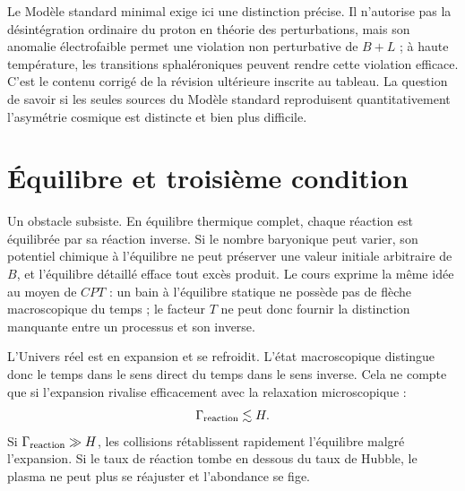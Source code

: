 Le Modèle standard minimal exige ici une distinction précise. Il n’autorise pas la désintégration ordinaire du proton en théorie des perturbations, mais son anomalie électrofaible permet une violation non perturbative de \(B+L\) ; à haute température, les transitions sphaléroniques peuvent rendre cette violation efficace. C’est le contenu corrigé de la révision ultérieure inscrite au tableau. La question de savoir si les seules sources du Modèle standard reproduisent quantitativement l’asymétrie cosmique est distincte et bien plus difficile.

\section{Équilibre et troisième condition}

Un obstacle subsiste. En équilibre thermique complet, chaque réaction est équilibrée par sa réaction inverse. Si le nombre baryonique peut varier, son potentiel chimique à l’équilibre ne peut préserver une valeur initiale arbitraire de \(B\), et l’équilibre détaillé efface tout excès produit. Le cours exprime la même idée au moyen de \(CPT\) : un bain à l’équilibre statique ne possède pas de flèche macroscopique du temps ; le facteur \(T\) ne peut donc fournir la distinction manquante entre un processus et son inverse.

L’Univers réel est en expansion et se refroidit. L’état macroscopique distingue donc le temps dans le sens direct du temps dans le sens inverse. Cela ne compte que si l’expansion rivalise efficacement avec la relaxation microscopique :
\begin{equation}
\Gamma_{\rm reaction}\lesssim H.
\label{eq:c08-freezeout-condition}
\end{equation}
Si \(\Gamma_{\rm reaction}\gg H\), les collisions rétablissent rapidement l’équilibre malgré l’expansion. Si le taux de réaction tombe en dessous du taux de Hubble, le plasma ne peut plus se réajuster et l’abondance se fige.

\begin{classroomqa}
\end{classroomqa}

